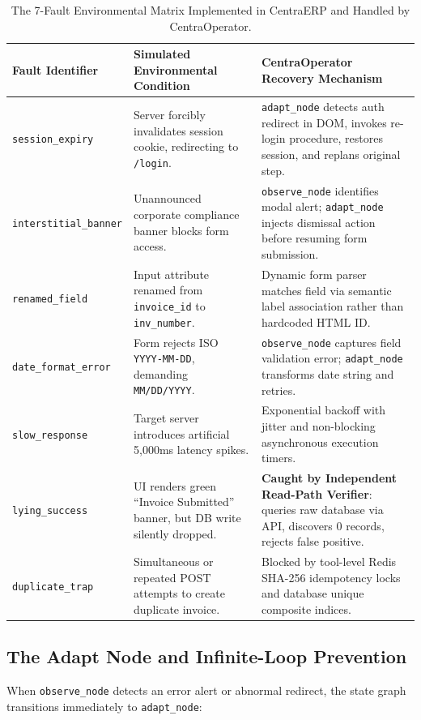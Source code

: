\begin{table}[htbp]
  \centering
  \small
  \begin{tabularx}{\textwidth}{l p{4.5cm} X}
    \toprule
    \textbf{Fault Identifier} & \textbf{Simulated Environmental Condition} & \textbf{CentraOperator Recovery Mechanism} \\
    \midrule
    \texttt{session\_expiry} & Server forcibly invalidates session cookie, redirecting to \texttt{/login}. & \texttt{adapt\_node} detects auth redirect in DOM, invokes re-login procedure, restores session, and replans original step. \\
    \addlinespace
    \texttt{interstitial\_banner} & Unannounced corporate compliance banner blocks form access. & \texttt{observe\_node} identifies modal alert; \texttt{adapt\_node} injects dismissal action before resuming form submission. \\
    \addlinespace
    \texttt{renamed\_field} & Input attribute renamed from \texttt{invoice\_id} to \texttt{inv\_number}. & Dynamic form parser matches field via semantic label association rather than hardcoded HTML ID. \\
    \addlinespace
    \texttt{date\_format\_error} & Form rejects ISO \texttt{YYYY-MM-DD}, demanding \texttt{MM/DD/YYYY}. & \texttt{observe\_node} captures field validation error; \texttt{adapt\_node} transforms date string and retries. \\
    \addlinespace
    \texttt{slow\_response} & Target server introduces artificial 5,000ms latency spikes. & Exponential backoff with jitter and non-blocking asynchronous execution timers. \\
    \addlinespace
    \texttt{lying\_success} & UI renders green ``Invoice Submitted'' banner, but DB write silently dropped. & \textbf{Caught by Independent Read-Path Verifier}: queries raw database via API, discovers 0 records, rejects false positive. \\
    \addlinespace
    \texttt{duplicate\_trap} & Simultaneous or repeated POST attempts to create duplicate invoice. & Blocked by tool-level Redis SHA-256 idempotency locks and database unique composite indices. \\
    \bottomrule
  \end{tabularx}
  \caption{The 7-Fault Environmental Matrix Implemented in CentraERP and Handled by CentraOperator.}
  \label{tab:fault_matrix}
\end{table}

\subsection{The Adapt Node and Infinite-Loop Prevention}
When \texttt{observe\_node} detects an error alert or abnormal redirect, the state graph transitions immediately to \texttt{adapt\_node}:

